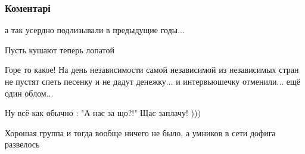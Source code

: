  
 
 
 
 
\subsubsection{Коментарі}
\label{sec:30_07_2021.fb.berdnik_miroslava.1.grin_grey_klymenko_time.cmt}

\begin{itemize}
 
а так усердно подлизывали в предыдущие годы...

\begin{itemize}
 
Пусть кушают теперь лопатой
\end{itemize}

 

Горе то какое! На день независимости самой независимой из независимых стран не
пустят спеть песенку и не дадут денежку... и интервьюшечку отменили... ещё один
облом...

Ну всё как обычно : "А нас за що?!" Щас заплачу! )))


 
Хорошая группа и тогда вообще ничего не было, а умников в сети дофига развелось


\end{itemize}

